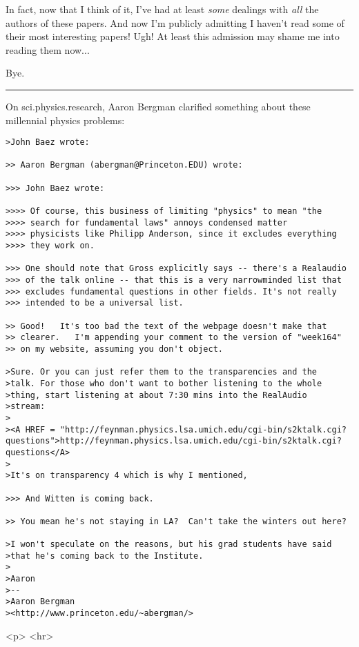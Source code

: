 In fact, now that I think of it, I've had at least \emph{some} dealings with
\emph{all} the authors of these papers.  And now I'm publicly admitting I
haven't read some of their most interesting papers!  Ugh!  At least
this admission may shame me into reading them now...

Bye.

\par\noindent\rule{\textwidth}{0.4pt}
On sci.physics.research, Aaron Bergman clarified something about
these millennial physics problems:

\begin{verbatim}
>John Baez wrote:

>> Aaron Bergman (abergman@Princeton.EDU) wrote:
 
>>> John Baez wrote:

>>>> Of course, this business of limiting "physics" to mean "the 
>>>> search for fundamental laws" annoys condensed matter 
>>>> physicists like Philipp Anderson, since it excludes everything 
>>>> they work on.  
 
>>> One should note that Gross explicitly says -- there's a Realaudio 
>>> of the talk online -- that this is a very narrowminded list that 
>>> excludes fundamental questions in other fields. It's not really 
>>> intended to be a universal list.
 
>> Good!   It's too bad the text of the webpage doesn't make that
>> clearer.   I'm appending your comment to the version of "week164" 
>> on my website, assuming you don't object.

>Sure. Or you can just refer them to the transparencies and the 
>talk. For those who don't want to bother listening to the whole 
>thing, start listening at about 7:30 mins into the RealAudio 
>stream:
>
><A HREF = "http://feynman.physics.lsa.umich.edu/cgi-bin/s2ktalk.cgi?questions">http://feynman.physics.lsa.umich.edu/cgi-bin/s2ktalk.cgi?questions</A>
>
>It's on transparency 4 which is why I mentioned,

>>> And Witten is coming back.
 
>> You mean he's not staying in LA?  Can't take the winters out here?

>I won't speculate on the reasons, but his grad students have said 
>that he's coming back to the Institute. 
>
>Aaron
>-- 
>Aaron Bergman
><http://www.princeton.edu/~abergman/>

\end{verbatim}
    



<p> <hr>



